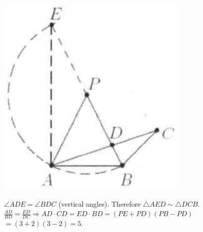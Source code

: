 \documentclass{article}
\begin{document}
\includegraphics[width=\textwidth]{images/211.jpg}


\(\angle A D E=\angle B D C\) (vertical angles). Therefore \(\triangle A E D \sim \triangle D C B\).\\
\(\frac{A D}{B D}=\frac{E D}{D C} \Rightarrow A D \cdot C D=E D \cdot B D=(P E+P D)(P B-P D)\)\\
\(=(3+2)(3-2)=5\).
\end{document}
